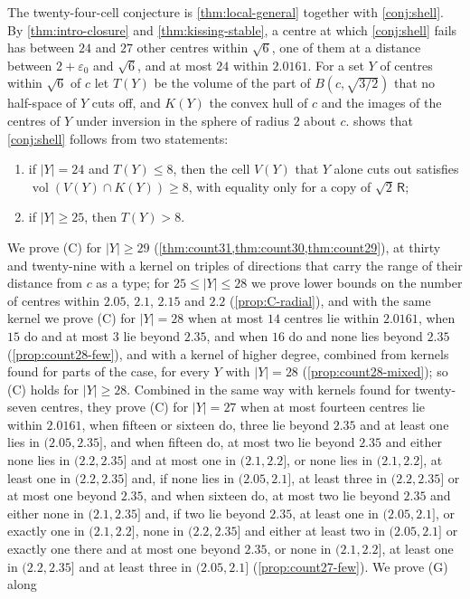 \documentclass[11pt,reqno]{amsart}
\renewcommand{\_}{\origunderscore\allowbreak}
\numberwithin{equation}{section}
\theoremstyle{plain}
\theoremstyle{definition}
\theoremstyle{remark}
\newcommand{\Rt}{\mathsf{R}}                 %
\DeclareMathOperator{\vol}{vol}
\begin{document}
The twenty-four-cell conjecture is \cref{thm:local-general} together with
\cref{conj:shell}. By \cref{thm:intro-closure} and
\cref{thm:kissing-stable}, a centre at which \cref{conj:shell} fails has
between $24$ and $27$ other centres within $\sqrt6$, one of them at a
distance between $2+\varepsilon_0$ and $\sqrt6$, and at most $24$ within
$2.0161$.
For a set $Y$ of centres within $\sqrt6$ of $c$ let $T(Y)$ be the
volume of the part of $B(c,\sqrt{3/2})$ that no half-space of $Y$ cuts off,
and $K(Y)$ the convex hull of $c$ and the images of the centres of $Y$ under
inversion in the sphere of radius $2$ about $c$.
 shows that \cref{conj:shell} follows from two
statements:
\begin{enumerate}[leftmargin=2.6em]
\item[\textup{(G)}] if $|Y|=24$ and $T(Y)\le8$, then the cell $V(Y)$ that
$Y$ alone cuts out satisfies $\vol(V(Y)\cap K(Y))\ge8$, with equality only
for a copy of $\sqrt2\,\Rt$;
\item[\textup{(C)}] if $|Y|\ge25$, then $T(Y)>8$.
\end{enumerate}
We prove (C) for $|Y|\ge29$ (\cref{thm:count31,thm:count30,thm:count29}), at
thirty and twenty-nine with a kernel on triples of directions that carry the
range of their distance from $c$ as a type; for $25\le|Y|\le28$ we prove lower bounds on
the number of centres within $2.05$, $2.1$, $2.15$ and $2.2$
(\cref{prop:C-radial}), and with the same kernel we prove (C) for
$|Y|=28$ when at most $14$ centres lie within $2.0161$, when $15$ do
and at most $3$ lie beyond $2.35$, and when $16$ do and none lies beyond
$2.35$ (\cref{prop:count28-few}), and with a kernel of higher degree,
combined from kernels found for parts of the case, for every $Y$ with
$|Y|=28$ (\cref{prop:count28-mixed}); so (C) holds for $|Y|\ge28$. Combined
in the same way with kernels found for twenty-seven centres, they prove (C)
for $|Y|=27$ when at most fourteen centres lie within $2.0161$, when
fifteen or sixteen do, three lie beyond $2.35$ and at least one lies in
$(2.05,2.35]$, and when fifteen do, at most two lie beyond $2.35$ and either none
lies in $(2.2,2.35]$ and at most one in $(2.1,2.2]$, or none lies in $(2.1,2.2]$, at least one in $(2.2,2.35]$ and, if none lies in $(2.05,2.1]$, at least three in $(2.2,2.35]$ or at most one beyond $2.35$, and when sixteen do,
at most two lie beyond $2.35$ and either none in $(2.1,2.35]$ and, if two lie beyond $2.35$, at least one in $(2.05,2.1]$, or exactly one in $(2.1,2.2]$, none in $(2.2,2.35]$ and either at least two in $(2.05,2.1]$ or exactly one there and at most one beyond $2.35$, or none in $(2.1,2.2]$, at least one in $(2.2,2.35]$ and at least three in $(2.05,2.1]$ (\cref{prop:count27-few}). We prove (G) along
\end{document}
